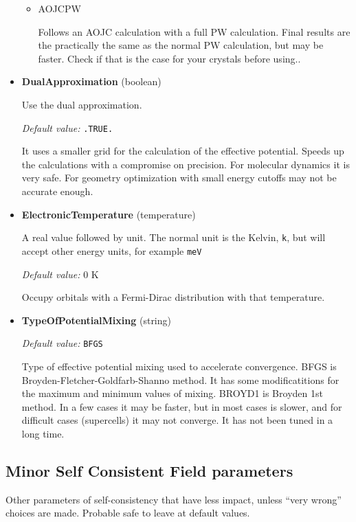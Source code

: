 \documentclass[11pt]{article}
\begin{document}
\begin{itemize}
\begin{itemize}
    \item{AOJCPW}

    Follows an AOJC calculation with a full PW calculation.  Final results are the
    practically the same as the normal PW calculation, but may be faster.
    Check if that is the case for your crystals before using..

  \end{itemize}

\item{\bf DualApproximation} (boolean)

   Use the dual approximation.

  \textit{Default value:}  \texttt{.TRUE.}

   It uses a smaller grid for the calculation of the
   effective potential.  Speeds up the calculations with a compromise on precision.
   For molecular dynamics it is very safe.  For geometry optimization with small
   energy cutoffs may not be accurate enough.

\item{\bf ElectronicTemperature} (temperature)

   A real value followed by unit.  The normal unit is the Kelvin, \texttt{k},
   but will accept other energy units, for example \texttt{meV}

  \textit{Default value:} 0 K

   Occupy orbitals with a Fermi-Dirac distribution with that temperature.

\item{\bf TypeOfPotentialMixing} (string)

  \textit{Default value:}  \texttt{BFGS}

   Type of effective potential mixing used to accelerate convergence.
   BFGS is Broyden-Fletcher-Goldfarb-Shanno method.  It has some modificatitions
   for the maximum and minimum values of mixing.
   BROYD1 is Broyden 1st method.
   In a few cases it may be faster, but in most cases is slower,
   and for difficult cases (supercells) it may not converge.
   It has not been tuned in a long time.

\end{itemize}



\subsection{Minor Self Consistent Field parameters}

Other parameters of self-consistency that have less impact, unless ``very wrong''
choices are made.  Probable safe to leave at default values.
\end{document}
